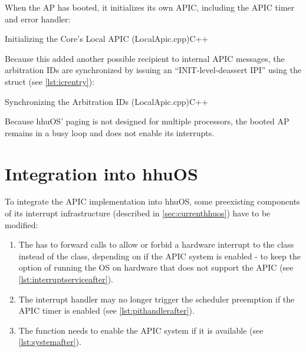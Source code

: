 When the AP has booted, it initializes its own APIC, including the APIC timer and error handler:

\begin{codeblock}{Initializing the Core's Local APIC (LocalApic.cpp)}{C++}
\end{codeblock}

Because this added another possible recipient to internal APIC messages, the arbitration IDs are
synchronized by issuing an ``INIT-level-deassert IPI'' using the  struct (see
\autoref{lst:icrentry}):

\begin{codeblock}{Synchronizing the Arbitration IDs (LocalApic.cpp)}{C++}
\end{codeblock}

Because hhuOS' paging is not designed for multiple processors, the booted AP remains in a busy loop
and does not enable its interrupts.

\clearpage %

\section{Integration into hhuOS}
\label{sec:hhuosintegration}

To integrate the APIC implementation into hhuOS, some preexisting components of its interrupt
infrastructure (described in \autoref{sec:currenthhuos}) have to be modified:

\begin{enumerate}
  \item The  has to forward calls to allow or forbid a hardware interrupt to the
         class instead of the  class, depending on if the APIC system is enabled - to
        keep the option of running the OS on hardware that does not support the APIC (see
        \autoref{lst:interruptserviceafter}).
  \item The  interrupt handler may no longer trigger the scheduler preemption if the APIC timer
        is enabled (see \autoref{lst:pithandlerafter}).
  \item The  function needs to enable the APIC system if it is available
        (see \autoref{lst:systemafter}).
\end{enumerate}

